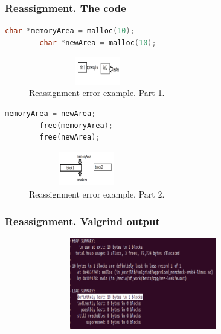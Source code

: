\documentclass{bredelebeamer}
\begin{document}
\begin{frame}[fragile]
	\frametitle{Reassignment. The code}
	\begin{center}
		\begin{lstlisting}[language=C++, caption={Reassignment error example. Part 1.}]
		char *memoryArea = malloc(10);
		char *newArea = malloc(10);
		\end{lstlisting}

		\begin{figure}
			\includegraphics[height=1.2cm,width=6cm]{reassignment1.png}
			\caption{Reassignment error example. Part 1.}
		\end{figure}

		\begin{lstlisting}[language=C++, caption={Reassignment error example. Part 2.}]
		memoryArea = newArea;
		free(memoryArea);
		free(newArea);
		\end{lstlisting}

		\begin{figure}
			\includegraphics[height=1.5cm,width=5cm]{reassignment2.png}
			\caption{Reassignment error example. Part 2.}
		\end{figure}
	\end{center}
\end{frame}

\begin{frame}[fragile]
	\frametitle{Reassignment. Valgrind output}
	\begin{center}
		\begin{figure}
			\includegraphics[height=4cm,width=10cm]{reassignment-valgrind.png}
		\end{figure}
	\end{center}
\end{frame}
\end{document}
